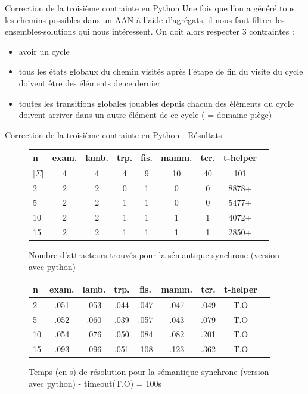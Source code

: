 \documentclass{beamer}
\begin{document}
\begin{frame}{Correction de la troisième contrainte en Python}
	\pause
	Une fois que l'on a généré tous les chemins possibles dans un AAN à l'aide d'agrégats, il nous faut filtrer les ensembles-solutions qui nous intéressent. On doit alors respecter 3 contraintes : \\
	\begin{itemize}
		\pause
		\item avoir un cycle
		\pause
		\item tous les états globaux du chemin visités après l'étape de fin du visite du cycle doivent être des éléments de ce dernier
		\pause
		\item toutes les transitions globales jouables depuis chacun des éléments du cycle doivent arriver dans un autre élément de ce cycle ( = domaine piège)\\
	\end{itemize}
\end{frame}

\begin{frame}{Correction de la troisième contrainte en Python - Résultats}
	\begin{figure}[!h]
		\begin{tabular}{l|c<{\onslide<2->}c<{\onslide<3->}c<{\onslide<4->}c<{\onslide<5->}c<{\onslide<6->}c<{\onslide<7->}c<{\onslide}c}
			n & exam. & lamb. & trp. & fis. & mamm. & tcr. & t-helper \\ \hline
			$|\Sigma|$ & 4 & 4 & 4 & 9 & 10 & 40 & 101\\ \hline
			2     & 2 & 2 & 0 & 1 & 0 & 0 & 8878+\\
			5     & 2 & 2 & 1 & 1 & 0 & 0 & 5477+\\
			10    & 2 & 2 & 1 & 1 & 1 & 1 & 4072+\\
			15    & 2 & 2 & 1 & 1 & 1 & 1 & 2850+
		\end{tabular}
		\caption{Nombre d'attracteurs trouvés pour la sémantique synchrone (version avec python)}
		\label{label-figure5}
	\end{figure}
	
	\begin{figure}[!h]
		\begin{tabular}{l|c<{\onslide<2->}c<{\onslide<3->}c<{\onslide<4->}c<{\onslide<5->}c<{\onslide<6->}c<{\onslide<7->}c<{\onslide}c}
			n & exam. & lamb. & trp. & fis. & mamm. & tcr. & t-helper \\ \hline
			2     & .051 & .053 & .044 & .047 & .047 & .049 & T.O\\
			5     & .052 & .060 & .039 & .057 & .043 & .079 & T.O\\
			10    & .054 & .076 & .050 & .084 & .082 & .201 & T.O\\
			15    & .093 & .096 & .051 & .108 & .123 & .362 & T.O
		\end{tabular}
		\caption{Temps (en s) de résolution pour la sémantique synchrone (version avec python) - timeout(T.O) = 100s}
		\label{label-figure6}
	\end{figure}
\end{frame}
\end{document}
